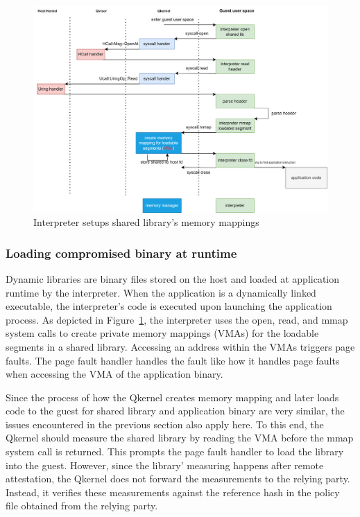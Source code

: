 \begin{figure}[H]
  \centering
  \includegraphics[width=1\textwidth]{images/load_shared_libarart.png}
  \caption[Interpreter setups shared library's memory mappings]{Interpreter setups shared library's memory mappings}
  \label{fig:load_shared_libarart}
\end{figure}


\subsubsection{Loading compromised binary at runtime}
Dynamic libraries are binary files stored on the host and loaded at application runtime by the interpreter. When the application is a dynamically linked executable, the interpreter’s code is executed upon launching the application process. 
As depicted in Figure~\ref{fig:load_shared_libarart}, the interpreter uses the open, read, and mmap system calls to create private memory mappings (VMAs) for the loadable segments in a shared library. Accessing an address within the VMAs triggers 
page faults. The page fault handler handles the fault like how it handles page faults when accessing the VMA of the application binary. 

Since the process of how the Qkernel creates memory mapping and later loads code to the guest for shared library and application binary are very similar, the issues encountered in the previous section also apply here. To this end, the Qkernel should 
measure the shared library by reading the VMA before the mmap system call is returned. This prompts the page fault handler to load the library into the guest. However, since the library’ measuring happens after remote attestation, the Qkernel does 
not forward the measurements to the relying party. Instead, it verifies these measurements against the reference hash in the policy file obtained from the relying party.

